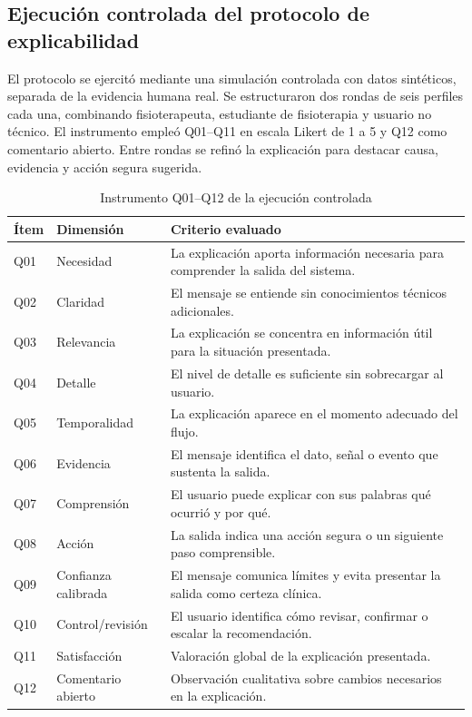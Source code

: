 \documentclass[12pt,a4paper]{article}
\begin{document}
\subsection{Ejecución controlada del protocolo de explicabilidad}
El protocolo se ejercitó mediante una simulación controlada con datos sintéticos, separada de la evidencia humana real. Se estructuraron dos rondas de seis perfiles cada una, combinando fisioterapeuta, estudiante de fisioterapia y usuario no técnico. El instrumento empleó Q01--Q11 en escala Likert de 1 a 5 y Q12 como comentario abierto. Entre rondas se refinó la explicación para destacar causa, evidencia y acción segura sugerida.


\begin{table}[H]\centering\caption{Instrumento Q01--Q12 de la ejecución controlada}
\small
\begin{tabularx}{\textwidth}{p{}p{}X}
\toprule
\textbf{Ítem}&\textbf{Dimensión}&\textbf{Criterio evaluado}\\\midrule
Q01&Necesidad&La explicación aporta información necesaria para comprender la salida del sistema.\\
Q02&Claridad&El mensaje se entiende sin conocimientos técnicos adicionales.\\
Q03&Relevancia&La explicación se concentra en información útil para la situación presentada.\\
Q04&Detalle&El nivel de detalle es suficiente sin sobrecargar al usuario.\\
Q05&Temporalidad&La explicación aparece en el momento adecuado del flujo.\\
Q06&Evidencia&El mensaje identifica el dato, señal o evento que sustenta la salida.\\
Q07&Comprensión&El usuario puede explicar con sus palabras qué ocurrió y por qué.\\
Q08&Acción&La salida indica una acción segura o un siguiente paso comprensible.\\
Q09&Confianza calibrada&El mensaje comunica límites y evita presentar la salida como certeza clínica.\\
Q10&Control/revisión&El usuario identifica cómo revisar, confirmar o escalar la recomendación.\\
Q11&Satisfacción&Valoración global de la explicación presentada.\\
Q12&Comentario abierto&Observación cualitativa sobre cambios necesarios en la explicación.\\
\bottomrule
\end{tabularx}
\normalsize
\end{table}
\end{document}
